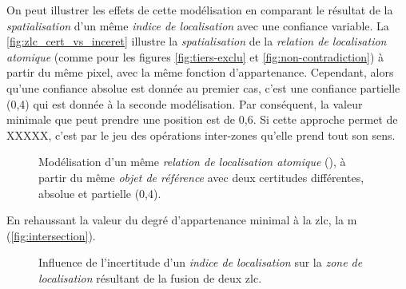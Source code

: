 On peut illustrer les effets de cette modélisation en comparant le
résultat de la \emph{spatialisation} d'un même \emph{indice de
  localisation} avec une confiance variable. La
\autoref{fig:zlc_cert_vs_inceret} illustre la \emph{spatialisation} de
la \emph{relation de localisation atomique} 
(comme pour les figures \ref{fig:tiers-exclu} et
\ref{fig:non-contradiction}) à partir du même pixel, avec la même
fonction d'appartenance. Cependant, alors qu'une confiance absolue est
donnée au premier cas, c'est une confiance partielle (0,4) qui est
donnée à la seconde modélisation. Par conséquent, la valeur minimale
que peut prendre une position est de 0,6. Si cette approche permet de
XXXXX, c'est par le jeu des opérations inter-zones qu'elle prend tout
son sens.

\begin{figure}
  \centering
  \subfloat[]{}\hspace{2cm}
  \subfloat[]{}
  \caption{Modélisation d'un même \emph{relation de localisation
      atomique} (\protect{}), à partir du même
    \emph{objet de référence} avec deux certitudes différentes,
    absolue et partielle (0,4).}
  \label{fig:zlc_cert_vs_inceret}
\end{figure}

En rehaussant la valeur du degré d'appartenance minimal à la \ac{zlc},
la m (\autoref{fig:intersection}).

\begin{figure}
  \centering
  \subfloat[]{}

  \subfloat[]{}
  \caption{Influence de l'incertitude d'un \emph{indice de
      localisation} sur la \emph{zone de localisation} résultant de la
    fusion de deux \ac{zlc}.}
  \label{fig:intersection}
\end{figure}



